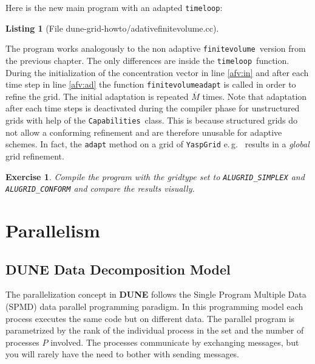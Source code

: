 \documentclass[11pt,a4paper,headinclude,footinclude,DIV16,headings=normal]{scrreprt}
\newcommand{\Dune}{{\sffamily\bfseries DUNE}\xspace}
\newtheorem{exc}{Exercise}[chapter]
\newtheorem{lst}{Listing}
\begin{document}
Here is the new main program with an adapted \lstinline!timeloop!:

\begin{lst}[File dune-grid-howto/adativefinitevolume.cc] \mbox{}
\nopagebreak

\end{lst}

The program works analogously to the non adaptive \lstinline!finitevolume!\
version from the previous chapter. The only differences are inside the
\lstinline!timeloop!\ function. During the initialization of the concentration
vector in line \ref{afv:in} and after each time step in line \ref{afv:ad} the
function \lstinline!finitevolumeadapt! is called in order to refine the grid.
The initial adaptation is repeated $\overline{M}$ times.  Note that adaptation
after each time steps is deactivated during the compiler phase for unstructured
grids with help of the \lstinline!Capabilities!\ class. This is because
structured grids do not allow a conforming refinement and are therefore
unusable for adaptive schemes. In fact, the \lstinline!adapt! method on a grid
of \lstinline!YaspGrid! e.\,g.~ results in a {\em global} grid refinement.

\begin{exc}
  Compile the program with the gridtype set to \lstinline!ALUGRID_SIMPLEX!
  and \lstinline!ALUGRID_CONFORM! and compare the results visually.
\end{exc}

\chapter{Parallelism}

\section{\texorpdfstring{\Dune{}}{DUNE} Data Decomposition Model}

The parallelization concept in \Dune{} follows the Single Program
Multiple Data (SPMD) data parallel programming paradigm. In this
programming model each process executes the same code but on different
data. The parallel program is parametrized
by the rank of the individual process in the set and the number of
processes $P$
involved. The processes communicate by exchanging messages, but you
will rarely have the need to bother with sending messages.
\end{document}
